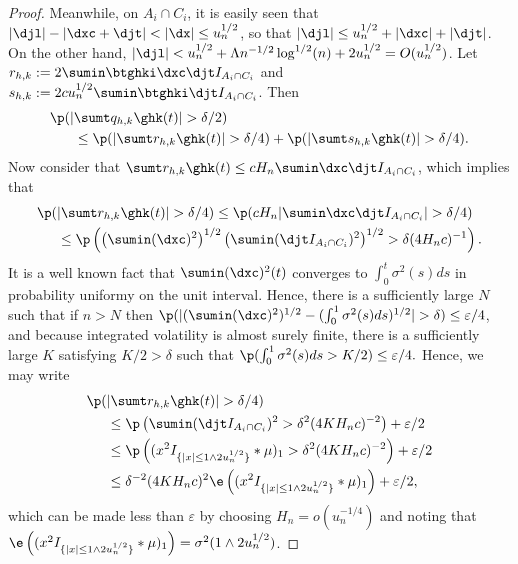 \begin{proof}
Meanwhile, on $A_i \cap C_i$, it is easily seen that $\vert \djl \vert - \vert \dxc + \djt \vert < \vert \dx \vert \le u_n^{1/2}$, so that $\vert \djl\vert \le u^{1/2}_n + \vert \dxc \vert + \vert \djt\vert$. On the other hand, $ \vert \djl \vert < u_n^{1/2} + \Lambda n^{-1/2} \log^{1/2}(n) + 2 u_n^{1/2} = O(u^{1/2}_n)$. Let $r_{h,k} :=  2 \sumin \btghki\dxc \djt I_{A_i \cap C_i}$ and $s_{h,k} := 2 c u_n^{1/2}\sumin \btghki \djt I_{A_i \cap C_i}$. Then 
\begin{align}
 \p(\vert&\sumt q_{h,k} \ghk(t) \vert > \delta/2)\notag \\&  \le\p(\vert\sumt r_{h,k} \ghk(t) \vert > \delta/4) + \p(\vert\sumt s_{h,k} \ghk(t) \vert > \delta/4).\notag
  \label{}
\end{align}
Now consider that $\sumt r_{h,k} \ghk(t) \le  c H_n \sumin \dxc \djt I_{A_i \cap C_i}$, which implies that  
\begin{align}
  \p(&\vert\sumt r_{h,k} \ghk(t) \vert > \delta/4) \le \p(c H_n \vert \sumin \dxc \djt I_{A_i \cap C_i} \vert  > \delta/4)\notag\\& \le \p\left( \left(\sumin (\dxc)^2\right)^{1/2} \left(\sumin ( \djt I_{A_i \cap C_i})^2\right)^{1/2} > \delta (4H_nc)^{-1}\right).\notag
  \label{}
\end{align}
It is a well known fact that  $\sumin (\dxc)^2 (t)$ converges to $\int_0^t\sigma^2(s)ds$ in probability uniformy on the unit interval. Hence, there is a sufficiently large $N$ such that if $n > N$ then $ \p(\vert (\sumin (\dxc)^2)^{1/2}  - (\int_0^1\sigma^2(s)ds)^{1/2}\vert > \delta ) \le  \varepsilon/4$, and because integrated volatility is almost surely finite, there is a sufficiently large $K$ satisfying  $K/2 > \delta$ such that $\p( \int_0^1\sigma^2(s)ds > K/2) \le \varepsilon/4.$ Hence, we may write
\begin{align}
\p(&\vert\sumt r_{h,k} \ghk(t) \vert > \delta/4) \notag \\&\le \p\left(\sumin ( \djt I_{A_i \cap C_i})^2 > \delta^2 (4K H_nc)^{-2}\right) + \varepsilon/2\notag\\&\le  \p\left( (x^2I_{\{\vert x\vert \le 1 \wedge 2 u_n^{1/2}\}}\ast\mu)_1 > \delta^2 (4K H_nc)^{-2}\right) + \varepsilon/2\notag\\
&\le \delta^{-2} (4K H_nc)^{2}\e\left( (x^2I_{\{\vert x\vert \le 1 \wedge 2 u_n^{1/2}\}}\ast\mu)_1  \right) + \varepsilon/2\notag
,
  \label{}
\end{align}
which can be made less than $\varepsilon$ by choosing $H_n = o(u^{-1/4}_n)$ and noting that   $\e\left( (x^2I_{\{\vert x\vert \le 1 \wedge 2 u_n^{1/2}\}}\ast\mu)_1  \right) = \sigma^2(1 \wedge 2 u_n^{1/2})$.


\end{proof}
